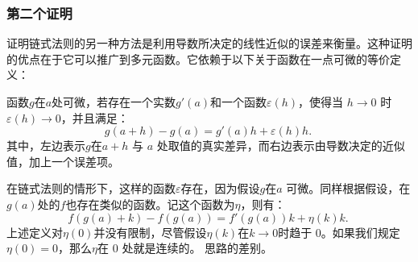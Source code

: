 \subsubsection{第二个证明}
证明链式法则的另一种方法是利用导数所决定的线性近似的误差来衡量。这种证明的优点在于它可以推广到多元函数。它依赖于以下关于函数在一点可微的等价定义：

函数$g$在$a$处可微，若存在一个实数$g'(a)$和一个函数$\varepsilon(h)$，使得当 $h \to 0$ 时 $\varepsilon(h) \to 0$，并且满足：
$$
g(a+h) - g(a) = g'(a)h + \varepsilon(h)h.~
$$
其中，左边表示$g$在$a+h$ 与 $a$ 处取值的真实差异，而右边表示由导数决定的近似值，加上一个误差项。

在链式法则的情形下，这样的函数$\varepsilon$存在，因为假设$g$在$a$ 可微。同样根据假设，在$g(a)$处的$f$也存在类似的函数。记这个函数为$\eta$，则有：
$$
f(g(a)+k) - f(g(a)) = f'(g(a))k + \eta(k)k.~
$$
上述定义对$\eta(0)$并没有限制，尽管假设$\eta(k)$在$k \to 0$时趋于 0。如果我们规定$\eta(0) = 0$，那么$\eta$在 0 处就是连续的。
思路的差别。
